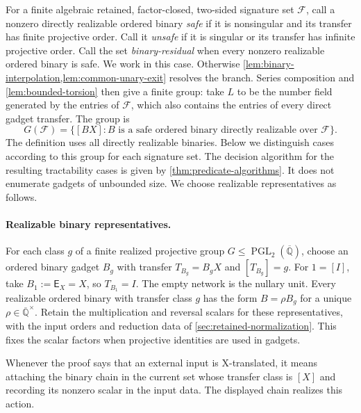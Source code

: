 \documentclass[11pt,letterpaper,onecolumn]{article}
\theoremstyle{plain}
\theoremstyle{definition}
\theoremstyle{remark}
\newcommand{\AlgNums}{\overline{\mathbb Q}}
\newcommand{\cF}{\mathcal F}
\newcommand{\PGL}{\operatorname{PGL}}
\begin{document}
For a finite algebraic retained, factor-closed, two-sided signature set
\(\cF\), call a nonzero directly realizable ordered binary \emph{safe} if it
is nonsingular and its transfer has finite projective order.  Call it
\emph{unsafe} if it is singular or its transfer has infinite projective
order.  Call the set \emph{binary-residual} when every nonzero realizable ordered
binary is safe.  We work in this case. Otherwise
\cref{lem:binary-interpolation,lem:common-unary-exit} resolves the branch.  Series composition and
\cref{lem:bounded-torsion} then give a finite group: take \(L\) to be the
number field generated by the entries of \(\cF\), which also contains the
entries of every direct gadget transfer.
The group is
\hypertarget{eq:complete-safe-group}{}
\begin{equation*}
  G(\cF)
  =
  \{[BX]:B\text{ is a safe ordered binary directly realizable over }\cF\}.
\end{equation*}
The definition uses all directly realizable binaries.  Below we distinguish
cases according to this group for each signature set.  The decision algorithm for the resulting tractability
cases is given by \cref{thm:predicate-algorithms}. It does not
enumerate gadgets of unbounded size.  We choose realizable representatives as follows.

\paragraph{Realizable binary representatives.}
\label{par:binary-representatives}


For each class \(g\) of a finite realized projective group
\(G\le\PGL_2(\AlgNums)\), choose an ordered binary gadget \(B_g\)
with transfer \(T_{B_g}=B_gX\) and \([T_{B_g}]=g\). For
\(1=[I]\), take \(B_1:=\mathsf E_X=X\), so \(T_{B_1}=I\).
The empty network is the nullary unit. Every realizable ordered binary
with transfer class \(g\) has the form \(B=\rho B_g\) for a unique
\(\rho\in\AlgNums^\times\). Retain the multiplication and reversal
scalars for these representatives, with the input orders and reduction
data of \cref{sec:retained-normalization}. This fixes the scalar factors
when projective identities are used in gadgets.

Whenever the proof says that an external input is X-translated, it means
attaching the binary chain in the current set whose transfer class is \([X]\) and
recording its nonzero scalar in the input data.  The displayed chain realizes this action.
\end{document}
